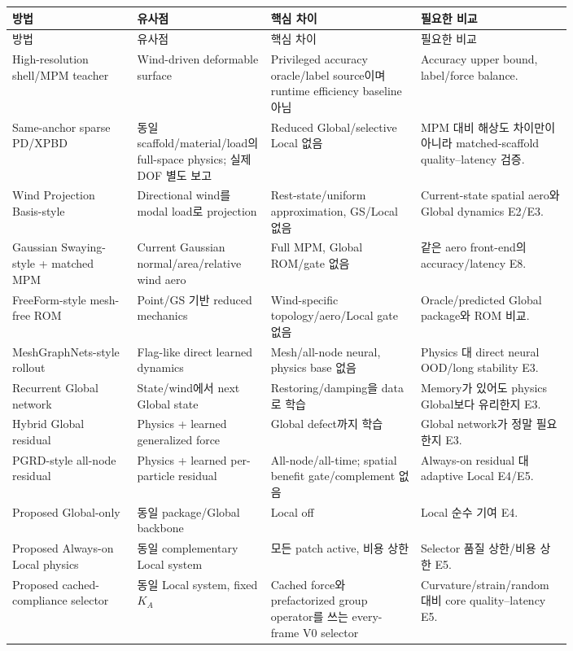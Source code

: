 \documentclass[10pt,a4paper]{article}
\begin{document}
\small
\begin{longtable}{L{0.20\linewidth}L{0.18\linewidth}L{0.24\linewidth}L{0.18\linewidth}}
\toprule
방법 & 유사점 & 핵심 차이 & 필요한 비교 \\
\midrule
\endfirsthead
\toprule
방법 & 유사점 & 핵심 차이 & 필요한 비교 \\
\midrule
\endhead
High-resolution shell/MPM teacher & Wind-driven deformable surface & Privileged accuracy oracle/label source이며 runtime efficiency baseline 아님 & Accuracy upper bound, label/force balance. \\
Same-anchor sparse PD/XPBD & 동일 scaffold/material/load의 full-space physics; 실제 DOF 별도 보고 & Reduced Global/selective Local 없음 & MPM 대비 해상도 차이만이 아니라 matched-scaffold quality--latency 검증. \\
Wind Projection Basis-style & Directional wind를 modal load로 projection & Rest-state/uniform approximation, GS/Local 없음 & Current-state spatial aero와 Global dynamics E2/E3. \\
Gaussian Swaying-style + matched MPM & Current Gaussian normal/area/relative wind aero & Full MPM, Global ROM/gate 없음 & 같은 aero front-end의 accuracy/latency E8. \\
FreeForm-style mesh-free ROM & Point/GS 기반 reduced mechanics & Wind-specific topology/aero/Local gate 없음 & Oracle/predicted Global package와 ROM 비교. \\
MeshGraphNets-style rollout & Flag-like direct learned dynamics & Mesh/all-node neural, physics base 없음 & Physics 대 direct neural OOD/long stability E3. \\
Recurrent Global network & State/wind에서 next Global state & Restoring/damping을 data로 학습 & Memory가 있어도 physics Global보다 유리한지 E3. \\
Hybrid Global residual & Physics + learned generalized force & Global defect까지 학습 & Global network가 정말 필요한지 E3. \\
PGRD-style all-node residual & Physics + learned per-particle residual & All-node/all-time; spatial benefit gate/complement 없음 & Always-on residual 대 adaptive Local E4/E5. \\
Proposed Global-only & 동일 package/Global backbone & Local off & Local 순수 기여 E4. \\
Proposed Always-on Local physics & 동일 complementary Local system & 모든 patch active, 비용 상한 & Selector 품질 상한/비용 상한 E5. \\
Proposed cached-compliance selector & 동일 Local system, fixed \(K_A\) & Cached force와 prefactorized group operator를 쓰는 every-frame V0 selector & Curvature/strain/random 대비 core quality--latency E5. \\

\end{longtable}
\end{document}
